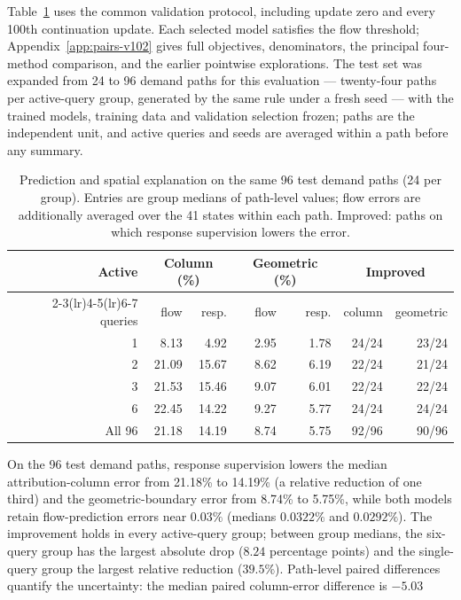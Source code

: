 Table~\ref{tab:pathtable} uses the common validation protocol, including update zero and every 100th continuation update. Each selected model satisfies the flow threshold; Appendix~\ref{app:pairs-v102} gives full objectives, denominators, the principal four-method comparison, and the earlier pointwise explorations. The test set was expanded from 24 to 96 demand paths for this evaluation --- twenty-four paths per active-query group, generated by the same rule under a fresh seed --- with the trained models, training data and validation selection frozen; paths are the independent unit, and active queries and seeds are averaged within a path before any summary.
\begin{table}[t]\centering\small
\caption{Prediction and spatial explanation on the same 96 test demand
paths (24 per group). Entries are group medians of path-level values;
flow errors are additionally averaged over the 41 states within each
path. Improved: paths on which response supervision lowers the error.}
\label{tab:pathtable}
\begin{tabular}{rrrrrrr}\toprule
Active & \multicolumn{2}{c}{Column (\%)} & \multicolumn{2}{c}{Geometric (\%)} & \multicolumn{2}{c}{Improved}\\
\cmidrule(lr){2-3}\cmidrule(lr){4-5}\cmidrule(lr){6-7}
queries & flow & resp. & flow & resp. & column & geometric\\\midrule
1 & 8.13 & 4.92 & 2.95 & 1.78 & 24/24 & 23/24\\
2 & 21.09 & 15.67 & 8.62 & 6.19 & 22/24 & 21/24\\
3 & 21.53 & 15.46 & 9.07 & 6.01 & 22/24 & 22/24\\
6 & 22.45 & 14.22 & 9.27 & 5.77 & 24/24 & 24/24\\
\midrule
All 96 & 21.18 & 14.19 & 8.74 & 5.75 & 92/96 & 90/96\\
\bottomrule\end{tabular}\end{table}
On the 96 test demand paths, response supervision lowers the median
attribution-column error from 21.18\% to 14.19\% (a relative reduction
of one third) and the geometric-boundary error from 8.74\% to 5.75\%,
while both models retain flow-prediction errors near $0.03\%$ (medians
$0.0322\%$ and $0.0292\%$). The improvement holds in every
active-query group; between group medians, the six-query group has the
largest absolute drop ($8.24$ percentage points) and the single-query
group the largest relative reduction ($39.5\%$). Path-level paired
differences quantify
the uncertainty: the median paired column-error difference is $-5.03$
